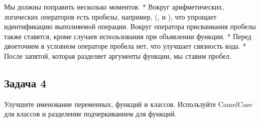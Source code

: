 \documentclass[letterpaper,10pt,russian]{sphinxmanual}
\begin{document}
\sphinxAtStartPar
{}

\sphinxAtStartPar
Мы должны поправить несколько моментов.
* Вокруг арифметических, логических операторов есть пробелы, например, (,  и ), что упрощает идентификацию выполняемой операции. Вокруг оператора присваивания пробелы также ставятся, кроме случаев использования при объявлении функции.
* Перед двоеточием в условном операторе пробела нет, что улучшает связность кода.
* После запятой, которая разделяет аргументы функции, мы ставим пробел.

\begin{sphinxVerbatim}[commandchars=\\\{\}]
   
       

  
  

   

   
\end{sphinxVerbatim}


\subsection{Задача 4}
\label{\detokenize{educational_materials/styles/exercises:id5}}
\sphinxAtStartPar
Улучшите именование переменных, функций и классов. Используйте CamelCase для классов и разделение подчеркиванием для функций.

\sphinxAtStartPar
{}
\end{document}
